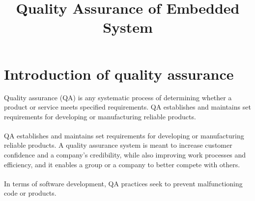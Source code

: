 \documentclass{article}
\title{Quality Assurance of Embedded System}
\date{}
\begin{document}
\maketitle
\tableofcontents
\newpage
\RaggedRight
\section{Introduction of quality assurance}
Quality assurance (QA) is any systematic process of determining whether a product or service meets specified requirements. QA establishes and maintains set requirements for developing or manufacturing reliable products.\\~\\
QA establishes and maintains set requirements for developing or manufacturing reliable products. A quality assurance system is meant to increase customer confidence and a company's credibility, while also improving work processes and efficiency, and it enables a group or a company to better compete with others.\\~\\
In terms of software development, QA practices seek to prevent malfunctioning code or products.
\end{document}
